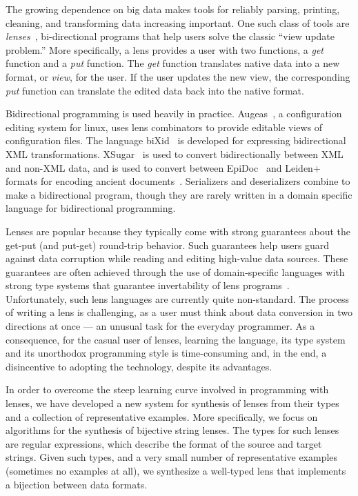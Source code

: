 \documentclass[numbers]{sigplanconf}
\begin{document}
The growing dependence on big data makes tools for reliably parsing,
printing, cleaning, and transforming data increasing important.
One such class of tools are \emph{lenses}~\cite{Focal2005-long}, bi-directional
programs that help users solve the classic ``view update problem.''
More specifically, a lens provides a user with two functions, a
\emph{get} function and a \emph{put} function.  The \emph{get}
function translates native data into a new format, or \emph{view}, for
the user.  If the user updates the new view, the corresponding
\emph{put} function can translate the edited data back into
the native format.

Bidirectional programming is used heavily in practice. 
Augeas~\cite{?}, a configuration editing system for linux, uses lens combinators
to provide editable views of configuration files.
The language biXid~\cite{bixid} is developed for expressing bidirectional XML
transformations.
XSugar~\cite{xsugar} is used to convert bidirectionally between XML and non-XML data,
and is used to convert between EpiDoc~\cite{epidoc} and Leiden+~\cite{leidenplus} formats for
encoding ancient documents~\cite{epidocleidenplus}.
Serializers and deserializers combine to make a bidirectional program, though
they are rarely written in a domain specific language for bidirectional
programming.

Lenses are popular because they typically come with strong guarantees
about the get-put (and put-get) round-trip behavior.  Such guarantees
help users guard against data corruption while reading and editing
high-value data sources.  These guarantees are often achieved through
the use of domain-specific languages with strong type systems that
guarantee invertability of lens programs~\cite{Focal2005-long,boomerang,symmetric-lenses}.  Unfortunately, such
lens languages are currently quite non-standard.  The
process of writing a lens is challenging, as a user must think
about data conversion in two directions at once --- an
unusual task for the everyday programmer.  As a consequence, 
for the casual user of lenses, learning the language, its type system and its
unorthodox programming style is time-consuming and, in the end,
a disincentive to adopting the technology, despite its advantages.

In order to overcome the steep learning curve involved in programming
with lenses, we have developed a new system for synthesis of lenses
from their types and a collection of representative examples.  More
specifically, we focus on algorithms for the synthesis of bijective
string lenses.  The types for such lenses are regular expressions,
which describe the format of the source and target strings.  Given
such types, and a very small number of representative examples (sometimes
no examples at all), we synthesize a well-typed lens that implements
a bijection between data formats.
\end{document}
